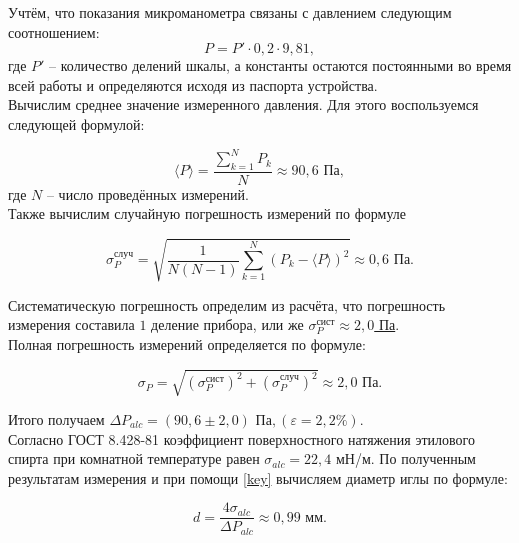 \documentclass[a4paper, 12pt]{article}
\begin{document}
    \noindent Учтём, что показания микроманометра связаны с давлением следующим соотношением: \[ P=P' \cdot 0,2 \cdot 9,81, \] где $P'$ -- количество делений шкалы, а константы остаются постоянными во время всей работы и определяются исходя из паспорта устройства.\\

    \noindent Вычислим среднее значение измеренного давления. Для этого воспользуемся следующей формулой:

    \begin{equation}
        \label{mid}
        \langle P \rangle = \frac{\sum\limits_{k=1}^{N} P_k}{N} \approx 90,6 \text{ Па},
    \end{equation}
    \noindent где $ N $ -- число проведённых измерений.\\

    \noindent Также вычислим случайную погрешность измерений по формуле

    \begin{equation}\label{occasion}
        \sigma_{P}^{\text{случ}} = \sqrt{\frac{1}{N(N-1)}\sum\limits_{k=1}^N\left(P_k-\langle P \rangle\right)^2} \approx 0,6 \text{ Па}.
    \end{equation}
    
    \noindent Систематическую погрешность определим из расчёта, что погрешность измерения составила $1$ деление прибора, или же \underline{$\sigma_{P}^\text{сист} \approx 2,0$ Па}.\\

    \noindent Полная погрешность измерений определяется по формуле:

    \begin{equation}
        \label{full_pogr}
        \sigma_{P}=\sqrt{(\sigma_{P}^\text{сист})^2 + (\sigma_{P}^\text{случ})^2} \approx 2,0 \text{ Па}.
    \end{equation}

    \noindent Итого получаем \underline{ $\Delta P_{alc} = (90,6 \pm 2,0) \text{ Па},$}\quad $(\varepsilon = 2,2 \%) $. \\

    \noindent Согласно ГОСТ 8.428-81 коэффициент поверхностного натяжения этилового спирта при комнатной температуре равен $ \sigma_{alc} = 22,4 $ мН/м. По полученным результатам измерения и при помощи \eqref{key} вычисляем диаметр иглы по формуле:

    \begin{equation}
        \label{igla}
        d=\frac{4\sigma_{alc}}{\Delta P_{alc}} \approx 0,99 \text{ мм}.
    \end{equation}
\end{document}
